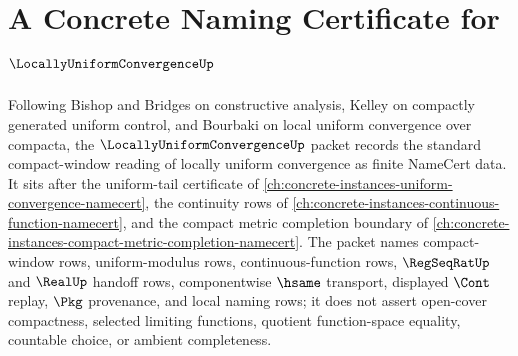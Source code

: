 \chapter{A Concrete Naming Certificate for $\LocallyUniformConvergenceUp$}
\label{ch:concrete-instances-locally-uniform-convergence-namecert}

Following Bishop and Bridges on constructive analysis, Kelley on compactly generated uniform control, and Bourbaki on local uniform convergence over compacta, the $\LocallyUniformConvergenceUp$ packet records the standard compact-window reading of locally uniform convergence as finite NameCert data. It sits after the uniform-tail certificate of \autoref{ch:concrete-instances-uniform-convergence-namecert}, the continuity rows of \autoref{ch:concrete-instances-continuous-function-namecert}, and the compact metric completion boundary of \autoref{ch:concrete-instances-compact-metric-completion-namecert}. The packet names compact-window rows, uniform-modulus rows, continuous-function rows, $\RegSeqRatUp$ and $\RealUp$ handoff rows, componentwise $\hsame$ transport, displayed $\Cont$ replay, $\Pkg$ provenance, and local naming rows; it does not assert open-cover compactness, selected limiting functions, quotient function-space equality, countable choice, or ambient completeness.

